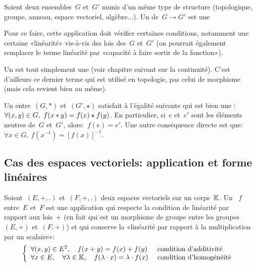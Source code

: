 \medskip
Soient deux ensembles~$G$ et~$G'$ munis d'un même type de structure (topologique, groupe,
anneau, espace vectoriel, algèbre...).
Un  de~$G \to G'$ est une 

Pour ce faire, cette application doit vérifier certaines conditions, notamment une certaine «linéarité» vis-à-vis des lois des~$G$ et~$G'$ (on pourrait également remplacer le terme linéarité par «capacité à faire sortir de la fonction»).

\medskip
Un  est tout simplement une  (voir chapitre suivant sur la continuité).
C'est d'ailleurs ce dernier terme qui est utilisé en topologie, pas celui de morphisme (mais cela revient bien au même).

\medskip
Un  entre~$(G,*)$ et~$(G',\star)$ satisfait à l'égalité suivante qui est bien une :
$\colorred
\forall (x,y)\in G,\ f(x*y)=f(x)\star f(y)
$.
En particulier, si~$e$ et~$e'$ sont les éléments neutres de~$G$ et~$G'$, alors:~$f(e)=e'$.
Une autre conséquence directe est que:~$\forall x \in G,\ f(x^{-1})=[f(x)]^{-1}$.

\medskip%
\subsection{Cas des espaces vectoriels: application et forme linéaires}

\begin{definition}
Soient~$(E,+,.)$ et~$(F,+,.)$ deux espaces vectoriels sur un corps~$\mathbb K$.
Un ~$f$ entre~$E$ et~$F$ est une application qui respecte la condition de linéarité par rapport aux lois~$+$ (en fait qui est un morphisme de groupe entre les groupes~$(E,+)$ et~$(F,+)$) et qui conserve la «linéarité par rapport à la multiplication par un scalaire»:
\begin{equation}\left\{
\begin{array}{ll}
\forall (x,y)\in E^2, \quad f(x+ y)=f(x)+ f(y) &\text{ condition d'additivité}\\
\forall x\in E,\quad \forall \lambda\in\mathbb K,\quad f(\lambda\cdot x)=\lambda\cdot f(x) &\text{ condition d'homogénéité}
\end{array}
\right.\end{equation}
\end{definition}

